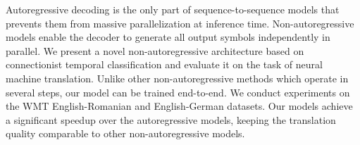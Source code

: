 Autoregressive decoding is the only part of sequence-to-sequence models that prevents them from massive parallelization at inference time. Non-autoregressive models enable the decoder to generate all output symbols independently in parallel. We present a novel non-autoregressive architecture based on connectionist temporal classification and evaluate it on the task of neural machine translation. Unlike other non-autoregressive methods which operate in several steps, our model can be trained end-to-end. We conduct experiments on the WMT English-Romanian and English-German datasets. Our models achieve a significant speedup over the autoregressive models, keeping the translation quality comparable to other non-autoregressive models.
